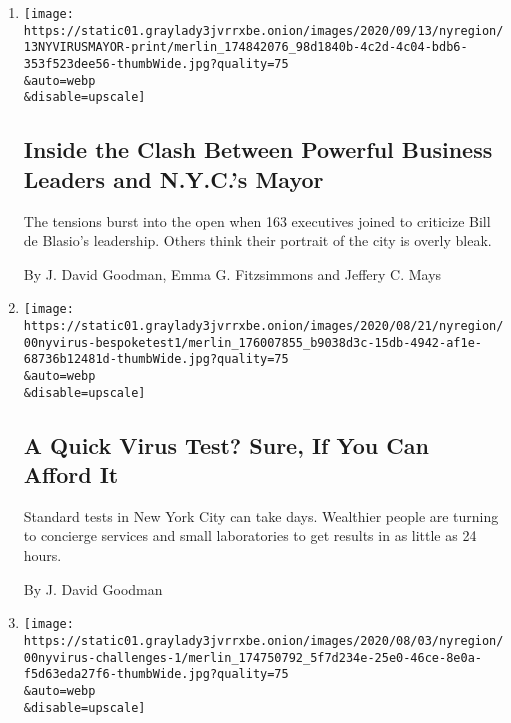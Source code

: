 \begin{enumerate}
\def\labelenumi{\arabic{enumi}.}
\item
  \href{/2020/09/12/nyregion/coronavirus-business-nyc-reopen.html}{}

  \texttt{[image: https://static01.graylady3jvrrxbe.onion/images/2020/09/13/nyregion/13NYVIRUSMAYOR-print/merlin\_174842076\_98d1840b-4c2d-4c04-bdb6-353f523dee56-thumbWide.jpg?quality=75\\\&auto=webp\\\&disable=upscale]}

  \hypertarget{inside-the-clash-between-powerful-business-leaders-and-nycs-mayor}{%
  \subsection{Inside the Clash Between Powerful Business Leaders and
  N.Y.C.'s
  Mayor}\label{inside-the-clash-between-powerful-business-leaders-and-nycs-mayor}}

  The tensions burst into the open when 163 executives joined to
  criticize Bill de Blasio's leadership. Others think their portrait of
  the city is overly bleak.

  By J. David Goodman, Emma G. Fitzsimmons and Jeffery C. Mays
\item
  \href{/2020/08/31/nyregion/rapid-coronavirus-test.html}{}

  \texttt{[image: https://static01.graylady3jvrrxbe.onion/images/2020/08/21/nyregion/00nyvirus-bespoketest1/merlin\_176007855\_b9038d3c-15db-4942-af1e-68736b12481d-thumbWide.jpg?quality=75\\\&auto=webp\\\&disable=upscale]}

  \hypertarget{a-quick-virus-test-sure-if-you-can-afford-it}{%
  \subsection{A Quick Virus Test? Sure, If You Can Afford
  It}\label{a-quick-virus-test-sure-if-you-can-afford-it}}

  Standard tests in New York City can take days. Wealthier people are
  turning to concierge services and small laboratories to get results in
  as little as 24 hours.

  By J. David Goodman
\item
  \href{/2020/08/17/nyregion/coronavirus-second-wave-nyc.html}{}

  \texttt{[image: https://static01.graylady3jvrrxbe.onion/images/2020/08/03/nyregion/00nyvirus-challenges-1/merlin\_174750792\_5f7d234e-25e0-46ce-8e0a-f5d63eda27f6-thumbWide.jpg?quality=75\\\&auto=webp\\\&disable=upscale]}


\end{enumerate}
